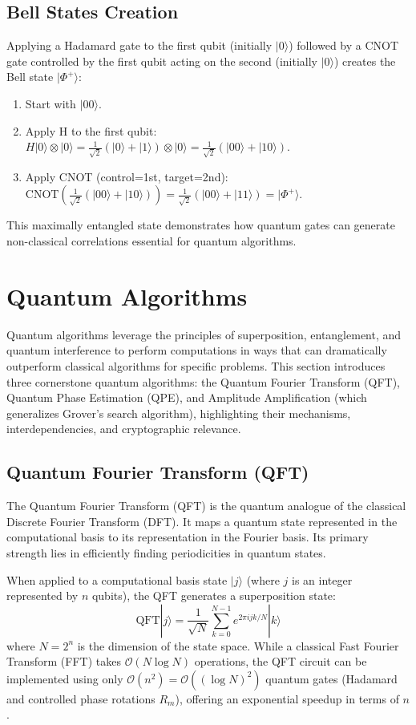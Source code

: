 \subsection*{Bell States Creation}
Applying a Hadamard gate to the first qubit (initially $|0\rangle$) followed by a CNOT gate controlled by the first qubit acting on the second (initially $|0\rangle$) creates the Bell state $|\Phi^+\rangle$:
\begin{enumerate}
    \item Start with $|00\rangle$.
    \item Apply H to the first qubit: $H|0\rangle \otimes |0\rangle = \frac{1}{\sqrt{2}}(|0\rangle + |1\rangle) \otimes |0\rangle = \frac{1}{\sqrt{2}}(|00\rangle + |10\rangle)$.
    \item Apply CNOT (control=1st, target=2nd): $\text{CNOT} \left( \frac{1}{\sqrt{2}}(|00\rangle + |10\rangle) \right) = \frac{1}{\sqrt{2}}(|00\rangle + |11\rangle) = |\Phi^+\rangle$.
\end{enumerate}
This maximally entangled state demonstrates how quantum gates can generate non-classical correlations essential for quantum algorithms.

\section{Quantum Algorithms}\label{sec:quantum_algorithms}

Quantum algorithms leverage the principles of superposition, entanglement, and quantum interference to perform computations in ways that can dramatically outperform classical algorithms for specific problems. This section introduces three cornerstone quantum algorithms: the Quantum Fourier Transform (QFT), Quantum Phase Estimation (QPE), and Amplitude Amplification (which generalizes Grover's search algorithm), highlighting their mechanisms, interdependencies, and cryptographic relevance.

\subsection{Quantum Fourier Transform (QFT)}\label{subsec:qft}
The Quantum Fourier Transform (QFT) is the quantum analogue of the classical Discrete Fourier Transform (DFT). It maps a quantum state represented in the computational basis to its representation in the Fourier basis. Its primary strength lies in efficiently finding periodicities in quantum states.

When applied to a computational basis state $|j\rangle$ (where $j$ is an integer represented by $n$ qubits), the QFT generates a superposition state:
\begin{equation}\label{eq:qft}
    \text{QFT}|j\rangle = \frac{1}{\sqrt{N}} \sum_{k=0}^{N-1} e^{2\pi i jk/N} |k\rangle
\end{equation}
where $N=2^n$ is the dimension of the state space. While a classical Fast Fourier Transform (FFT) takes $\mathcal{O}(N\log N)$ operations, the QFT circuit can be implemented using only $\mathcal{O}(n^2) = \mathcal{O}((\log N)^2)$ quantum gates (Hadamard and controlled phase rotations $R_m$), offering an exponential speedup in terms of $n$.

